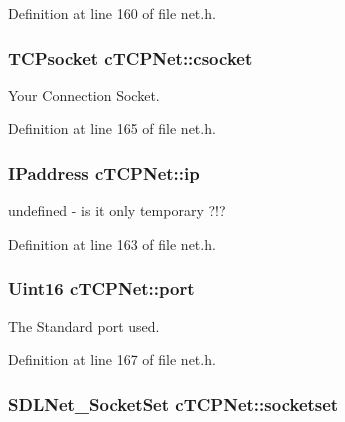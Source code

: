 Definition at line 160 of file net.\-h.

\hypertarget{classc_t_c_p_net_a67aece277603c2e1a53eb09d74618a9b}{
\subsubsection[{csocket}]{\setlength{\rightskip}{0pt plus 5cm}T\-C\-Psocket c\-T\-C\-P\-Net\-::csocket}}\label{classc_t_c_p_net_a67aece277603c2e1a53eb09d74618a9b}


Your Connection Socket. 



Definition at line 165 of file net.\-h.

\hypertarget{classc_t_c_p_net_a103f0ae57ea6253901756aa7ba2c1275}{
\subsubsection[{ip}]{\setlength{\rightskip}{0pt plus 5cm}I\-Paddress c\-T\-C\-P\-Net\-::ip}}\label{classc_t_c_p_net_a103f0ae57ea6253901756aa7ba2c1275}


undefined -\/ is it only temporary ?!? 



Definition at line 163 of file net.\-h.

\hypertarget{classc_t_c_p_net_aad0ef85255e170e890b7591169da57b0}{
\subsubsection[{port}]{\setlength{\rightskip}{0pt plus 5cm}Uint16 c\-T\-C\-P\-Net\-::port}}\label{classc_t_c_p_net_aad0ef85255e170e890b7591169da57b0}


The Standard port used. 



Definition at line 167 of file net.\-h.

\hypertarget{classc_t_c_p_net_aa4a4f4b31756814afe9358f006594a81}{
\subsubsection[{socketset}]{\setlength{\rightskip}{0pt plus 5cm}S\-D\-L\-Net\-\_\-\-Socket\-Set c\-T\-C\-P\-Net\-::socketset}}\label{classc_t_c_p_net_aa4a4f4b31756814afe9358f006594a81}


